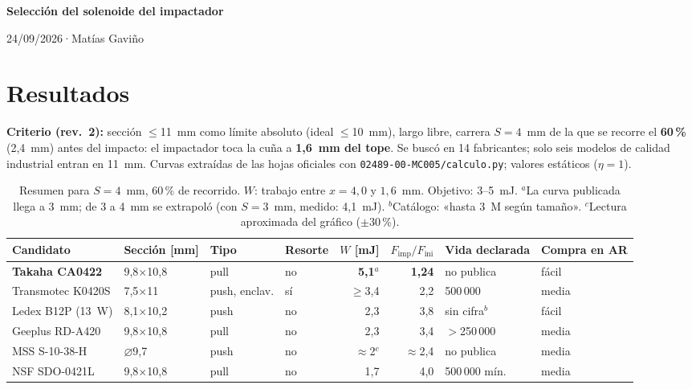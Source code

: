 \documentclass[11pt,a4paper]{article}
\newcommand{\titulo}{Selección del solenoide del impactador}
\newcommand{\autor}{Matías Gaviño}
\newcommand{\fecha}{24/09/2026}                    %
\newcommand{\cabecera}{%
  \thispagestyle{fancy}%
  {\fontsize{20}{24}\selectfont\bfseries\titulo\par}%
  \vspace{5pt}%
  {\small\color{gris-medio}\fecha\quad·\quad\autor\par}%
  \vspace{6pt}}
\begin{document}
\cabecera

\section{Resultados}
\textbf{Criterio (rev.~2):} sección $\leq$11~mm como límite absoluto (ideal $\leq$10~mm), largo libre, carrera
$S=4$~mm de la que se recorre el \textbf{60\,\%} (2,4~mm) antes del impacto: el impactador toca la cuña a
\textbf{1,6~mm del tope}. Se buscó en 14 fabricantes; solo seis modelos de calidad industrial entran en 11~mm.
Curvas extraídas de las hojas oficiales con \texttt{02489-00-MC005/calculo.py}; valores estáticos ($\eta=1$).

\begin{table}[H]\centering\footnotesize\setlength{\tabcolsep}{2.4pt}
\begin{tabular}{l l l l r r l l}
\toprule
Candidato & Sección [mm] & Tipo & Resorte & $W$ [mJ] & $F_\mathrm{imp}/F_\mathrm{ini}$ & Vida declarada & Compra en AR\\
\midrule
\textbf{Takaha CA0422}  & 9,8$\times$10,8 & pull           & no & \textbf{5,1}$^{a}$ & \textbf{1,24} & no publica & fácil\\
Transmotec K0420S       & 7,5$\times$11   & push, enclav.  & sí & $\geq$3,4 & 2,2  & 500\,000 & media\\
Ledex B12P (13~W)       & 8,1$\times$10,2 & push           & no & 2,3 & 3,8  & sin cifra$^{b}$ & fácil\\
Geeplus RD-A420         & 9,8$\times$10,8 & pull           & no & 2,3 & 3,4  & $>$250\,000 & media\\
MSS S-10-38-H           & $\varnothing$9,7 & push          & no & $\approx$2$^{c}$ & $\approx$2,4 & no publica & media\\
NSF SDO-0421L           & 9,8$\times$10,8 & pull           & no & 1,7 & 4,0  & 500\,000 mín. & media\\
\bottomrule
\end{tabular}
\caption{Resumen para $S=4$~mm, 60\,\% de recorrido. $W$: trabajo entre $x=4{,}0$ y $1{,}6$~mm. Objetivo:
3--5~mJ. $^{a}$La curva publicada llega a 3~mm; de 3 a 4~mm se extrapoló (con $S=3$~mm, medido: 4,1~mJ).
$^{b}$Catálogo: «hasta 3~M según tamaño». $^{c}$Lectura aproximada del gráfico ($\pm30$\,\%).}
\end{table}
\end{document}
